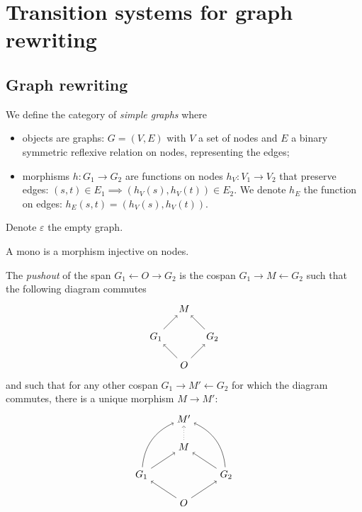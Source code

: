 \section{Transition systems for graph rewriting}

\subsection{Graph rewriting}

\begin{definition}
  We define the category of \emph{simple graphs} where
  \begin{itemize}
  \item objects are graphs: $G = (V,E)$ with $V$ a set of nodes and $E$ a binary symmetric reflexive relation on nodes, representing the edges;
  \item morphisms $h:G_1\to G_2$ are functions on nodes $h_V:V_1\to V_2$ that preserve edges: $(s,t)\in E_1\implies (h_V(s),h_V(t))\in E_2$. We denote $h_E$ the function on edges: $h_E(s,t) = (h_V(s), h_V(t))$.
  \end{itemize}
  Denote $\varepsilon$ the empty graph.
\end{definition}

A mono is a morphism injective on nodes.

\begin{definition}[Pushout]
  The \emph{pushout} of the span $G_1\leftarrow O\rightarrow G_2$ is the cospan $G_1\rightarrow M\leftarrow G_2$ such that the following diagram commutes
  \[
  \begin{tikzpicture} %
    \node (o) at (0,-1) {\(O\)};
    \node (l1) at (-1,0) {\(G_1\)};
    \node (l2) at (1,0) {\(G_2\)};
    \node (m) at (0,1) {\(M\)};
    \draw [->] (o) --  (l1);
    \draw [->] (o) --  (l2);
    \draw [->] (l1) --  (m);
    \draw [->] (l2) --  (m);
  \end{tikzpicture}
  \]
  and such that for any other cospan $G_1\rightarrow M'\leftarrow G_2$ for which the diagram commutes, there is a unique morphism $M\to M'$:
  \[
  \begin{tikzpicture} %
    \node (mp) at (0,2) {\(M'\)};
    \node (o) at (0,-1) {\(O\)};
    \node (l1) at (-1.5,0) {\(G_1\)};
    \node (l2) at (1.5,0) {\(G_2\)};
    \node (m) at (0,1) {\(M\)};
    \draw [->] (o) --  (l1);
    \draw [->] (o) --  (l2);
    \draw [->] (l1) --  (m);
    \draw [->] (l2) --  (m);
    \draw [->] (l1) to [bend left] (mp);
    \draw [->] (l2) to [bend right] (mp);
    \draw [->, dotted] (m) -- (mp);
  \end{tikzpicture}
  \]
\end{definition}

